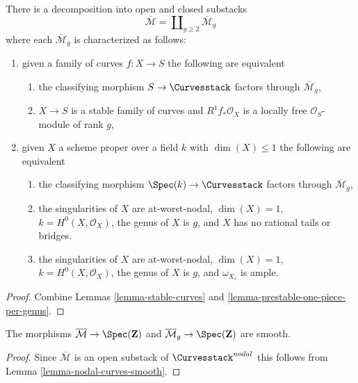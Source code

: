 \begin{lemma}
\label{lemma-stable-one-piece-per-genus}
There is a decomposition into open and closed substacks
$$
\overline{\mathcal{M}} = \coprod\nolimits_{g \geq 2} \overline{\mathcal{M}}_g
$$
where each $\overline{\mathcal{M}}_g$ is characterized as follows:
\begin{enumerate}
\item given a family of curves $f : X \to S$ the following are equivalent
\begin{enumerate}
\item the classifying morphism $S \to \Curvesstack$ factors
through $\overline{\mathcal{M}}_g$,
\item $X \to S$ is a stable family of curves and
$R^1f_*\mathcal{O}_X$ is a locally free $\mathcal{O}_S$-module of rank $g$,
\end{enumerate}
\item given $X$ a scheme proper over a field $k$ with
$\dim(X) \leq 1$ the following are equivalent
\begin{enumerate}
\item the classifying morphism $\Spec(k) \to \Curvesstack$
factors through $\overline{\mathcal{M}}_g$,
\item the singularities of $X$ are at-worst-nodal, $\dim(X) = 1$,
$k = H^0(X, \mathcal{O}_X)$, the genus of $X$ is $g$, and $X$
has no rational tails or bridges.
\item the singularities of $X$ are at-worst-nodal, $\dim(X) = 1$,
$k = H^0(X, \mathcal{O}_X)$, the genus of $X$ is $g$, and
$\omega_{X_s}$ is ample.
\end{enumerate}
\end{enumerate}
\end{lemma}

\begin{proof}
Combine Lemmas \ref{lemma-stable-curves} and
\ref{lemma-prestable-one-piece-per-genus}.
\end{proof}

\begin{lemma}
\label{lemma-stable-curves-smooth}
The morphisms
$\overline{\mathcal{M}} \to \Spec(\mathbf{Z})$ and
$\overline{\mathcal{M}}_g \to \Spec(\mathbf{Z})$
are smooth.
\end{lemma}

\begin{proof}
Since $\overline{\mathcal{M}}$ is an open substack of
$\Curvesstack^{nodal}$ this follows from
Lemma \ref{lemma-nodal-curves-smooth}.
\end{proof}

